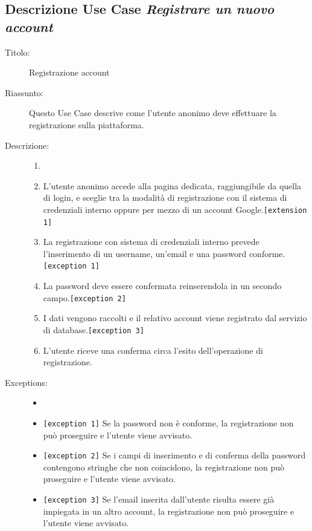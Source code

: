\documentclass[11pt, a4paper]{article}
\theoremstyle{definition} %
\begin{document}
\subsection*{Descrizione Use Case \textit{Registrare un nuovo account}}
\begin{description}
    \item[Titolo:] Registrazione account
    
    \item[Riassunto:] Questo Use Case descrive come l'utente anonimo deve
    effettuare la registrazione sulla piattaforma.

    \item[Descrizione:]
    \begin{enumerate}
        \item[]
        \item L'utente anonimo accede alla pagina dedicata, raggiungibile da quella di login, e sceglie tra la modalità di registrazione con il sistema di credenziali interno oppure per mezzo di un account Google.\texttt{[extension 1]}
        \item La registrazione con sistema di credenziali interno prevede l'inserimento di un username, un'email e una password conforme. \verb|[exception 1]|
        \item La password deve essere confermata reinserendola in un secondo campo.\verb|[exception 2]|
        \item I dati vengono raccolti e il relativo account viene registrato dal servizio di database.\texttt{[exception 3]}
        \item L'utente riceve una conferma circa l'esito dell'operazione di registrazione.
    \end{enumerate}
    
    \item[Exceptions:]
    \begin{itemize}
        \item[]
        \item \texttt{[exception 1]} Se la password non è conforme, la registrazione non può proseguire e l'utente viene avvisato.
        \item \texttt{[exception 2]} Se i campi di inserimento e di conferma della password contengono stringhe che non coincidono, la registrazione non può proseguire e l'utente viene avvisato.
        \item \texttt{[exception 3]} Se l'email inserita dall'utente risulta essere già impiegata in un altro account, la registrazione non può proseguire e l'utente viene avvisato.
    \end{itemize}


\end{description}
\end{document}
